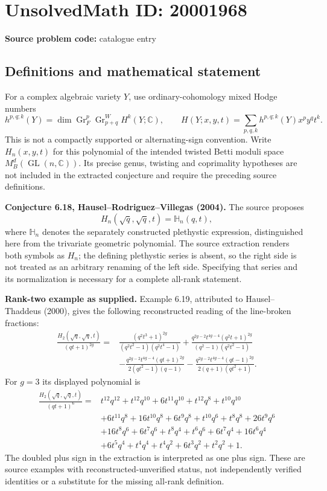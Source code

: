 \documentclass[11pt]{article}
\newcommand{\C}{\mathbb{C}}
\begin{document}
\section*{UnsolvedMath ID: 20001968}
\textbf{Source problem code:} catalogue entry
\subsection{Definitions and mathematical statement}
For a complex algebraic variety $Y$, use ordinary-cohomology mixed Hodge numbers
\[
 h^{p,q;k}(Y)=\dim\operatorname{Gr}_F^p
                       \operatorname{Gr}_{p+q}^WH^k(Y;\C),
 \qquad H(Y;x,y,t)=\sum_{p,q,k}h^{p,q;k}(Y)x^py^qt^k.
\]
This is not a compactly supported or alternating-sign convention. Write $H_n(x,y,t)$ for this polynomial of the intended twisted Betti moduli space $M_B^d(\operatorname{GL}(n,\C))$. Its precise genus, twisting and coprimality hypotheses are not included in the extracted conjecture and require the preceding source definitions.

\textbf{Conjecture 6.18, Hausel--Rodriguez--Villegas (2004).} The source proposes
\[
 H_n(\sqrt q,\sqrt q,t)=\mathbb H_n(q,t),
\]
where $\mathbb H_n$ denotes the separately constructed plethystic expression, distinguished here from the trivariate geometric polynomial. The source extraction renders both symbols as $H_n$; the defining plethystic series is absent, so the right side is not treated as an arbitrary renaming of the left side. Specifying that series and its normalization is necessary for a complete all-rank statement.

\textbf{Rank-two example as supplied.} Example 6.19, attributed to Hausel--Thaddeus (2000), gives the following reconstructed reading of the line-broken fractions:
\[
\begin{aligned}
 \frac{H_2(\sqrt q,\sqrt q,t)}{(qt+1)^{2g}}
 ={}&\frac{(q^2t^3+1)^{2g}}{(q^2t^2-1)(q^2t^4-1)}
 +\frac{q^{2g-2}t^{4g-4}(q^2t+1)^{2g}}{(q^2-1)(q^2t^2-1)}\\
 &-\frac{q^{2g-2}t^{4g-4}(qt+1)^{2g}}{2(qt^2-1)(q-1)}
 -\frac{q^{2g-2}t^{4g-4}(qt-1)^{2g}}{2(q+1)(qt^2+1)}.
\end{aligned}
\]
For $g=3$ its displayed polynomial is
\[
\begin{aligned}
 \frac{H_2(\sqrt q,\sqrt q,t)}{(qt+1)^6}
 ={}&t^{12}q^{12}+t^{12}q^{10}+6t^{11}q^{10}
      +t^{12}q^8+t^{10}q^{10}\\
 &+6t^{11}q^8+16t^{10}q^8+6t^9q^8+t^{10}q^6+t^8q^8
      +26t^9q^6\\
 &+16t^8q^6+6t^7q^6+t^8q^4+t^6q^6+6t^7q^4+16t^6q^4\\
 &+6t^5q^4+t^4q^4+t^4q^2+6t^3q^2+t^2q^2+1.
\end{aligned}
\]
The doubled plus sign in the extraction is interpreted as one plus sign. These are source examples with reconstructed-unverified status, not independently verified identities or a substitute for the missing all-rank definition.
\end{document}
